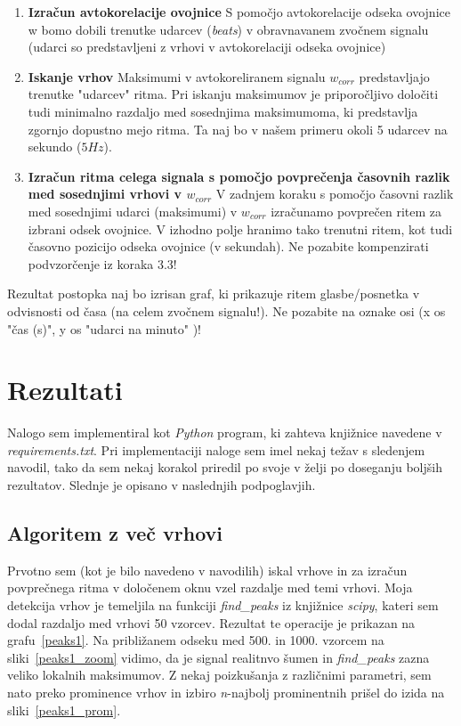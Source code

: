 \documentclass[a4paper,11pt]{article}
\begin{document}
\begin{enumerate}
	\begin{enumerate}[label*=\arabic*.]
	\item \textbf{Izračun avtokorelacije ovojnice}	
	S pomočjo avtokorelacije odseka ovojnice w bomo dobili trenutke udarcev (\textit{beats}) v obravnavanem zvočnem signalu (udarci so predstavljeni z vrhovi v avtokorelaciji odseka ovojnice)
	
	\item \textbf{Iskanje vrhov}
	Maksimumi v avtokoreliranem signalu $w_{corr}$ predstavljajo trenutke "udarcev" ritma. Pri iskanju maksimumov je priporočljivo določiti tudi minimalno razdaljo med sosednjima maksimumoma, ki predstavlja zgornjo dopustno mejo ritma. Ta naj bo v našem primeru okoli 5 udarcev na sekundo ($5 Hz$).	
	
	\item \textbf{Izračun ritma celega signala s pomočjo povprečenja časovnih razlik med sosednjimi vrhovi v $w_{corr}$}
	V zadnjem koraku s pomočjo časovni razlik med sosednjimi udarci (maksimumi) v $w_{corr}$ izračunamo povprečen ritem za izbrani odsek ovojnice. V izhodno polje hranimo tako trenutni ritem, kot tudi časovno pozicijo odseka ovojnice (v sekundah). Ne pozabite kompenzirati podvzorčenje iz koraka 3.3!
	
	\end{enumerate}

\end{enumerate}

Rezultat postopka naj bo izrisan graf, ki prikazuje ritem glasbe/posnetka v odvisnosti od časa (na celem zvočnem signalu!). Ne pozabite na oznake osi (x os "čas (s)", y os "udarci na minuto" )! 

\section{Rezultati}

Nalogo sem implementiral kot \textit{Python} program, ki zahteva knjižnice navedene v \textit{requirements.txt}. Pri implementaciji naloge sem imel nekaj težav s sledenjem navodil, tako da sem nekaj korakol priredil po svoje v želji po doseganju boljših rezultatov. Slednje je opisano v naslednjih podpoglavjih.

\subsection{Algoritem z več vrhovi}

Prvotno sem (kot je bilo navedeno v navodilih) iskal vrhove in za izračun povprečnega ritma v določenem oknu vzel razdalje med temi vrhovi. Moja detekcija vrhov je temeljila na funkciji \textit{find\_peaks} iz knjižnice \textit{scipy}, kateri sem dodal razdaljo med vrhovi 50 vzorcev. Rezultat te operacije je prikazan na grafu~\ref{peaks1}. Na približanem odseku med 500. in 1000. vzorcem na sliki~\ref{peaks1_zoom} vidimo, da je signal realitnvo šumen in \textit{find\_peaks} zazna veliko lokalnih maksimumov. Z nekaj poizkušanja z različnimi parametri, sem nato preko prominence vrhov in izbiro \textit{n}-najbolj prominentnih prišel do izida na sliki~\ref{peaks1_prom}. 
\end{document}
